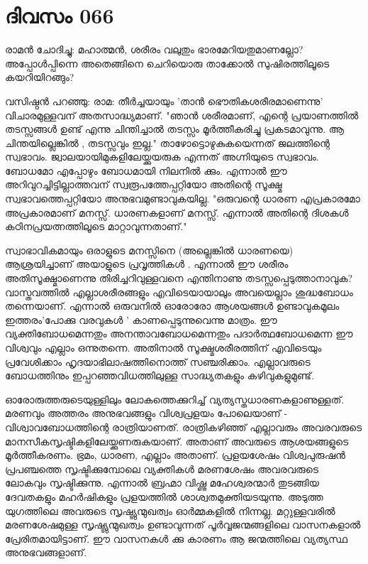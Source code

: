  
\section{ദിവസം 066}


രാമന്‍ ചോദിച്ചു: മഹാത്മന്‍, ശരീരം വലുതും ഭാരമേറിയതുമാണല്ലോ? അപ്പോള്‍പ്പിന്നെ അതെങ്ങിനെ ചെറിയൊരു താക്കോൽ സുഷിരത്തിലൂടെ കയറിയിറങ്ങും?

വസിഷ്ഠന്‍ പറഞ്ഞു: രാമ: തീര്‍ച്ചയായും 'താന്‍ ഭൌതികശരീരമാണെന്നു' വിചാരമുള്ളവന്‌ അതസാദ്ധ്യമാണ്‌. "ഞാന്‍ ശരീരമാണ്‌, എന്റെ പ്രയാണത്തില്‍ തടസ്സങ്ങള്‍ ഉണ്ട്‌ എന്നു ചിന്തിച്ചാല്‍ തടസ്സം മൂര്‍ത്തീകരിച്ചു പ്രകടമാവുന്നു. ആ ചിന്തയില്ലെങ്കില്‍ , തടസ്സവും ഇല്ല." താഴോട്ടൊഴുകുകയെന്നത്‌ ജലത്തിന്റെ സ്വഭാവം. ജ്വാലയായിമുകളിലേയ്ക്കുയരുക എന്നത്‌ അഗ്നിയുടെ സ്വഭാവം. ബോധമോ എപ്പോഴും ബോധമായി നിലനില്‍ ക്കും. എന്നാല്‍ ഈ അറിവുറച്ചിട്ടില്ലാത്തവന്‌ സ്വരൂപത്തേപ്പറ്റിയോ അതിന്റെ സൂക്ഷ്മ സ്വഭാവത്തെപ്പറ്റിയോ അനുഭവമുണ്ടാവുകയില്ല. "ഒരുവന്റെ ധാരണ എപ്രകാരമോ അപ്രകാരമാണ്‌ മനസ്സ്‌. ധാരണകളാണ്‌ മനസ്സ്‌. എന്നാല്‍ അതിന്റെ ദിശകള്‍ കഠിനപ്രയത്നത്തിലൂടെ മാറ്റാവുന്നതാണ്‌."

സ്വാഭാവികമായും ഒരാളുടെ മനസ്സിനെ (അല്ലെങ്കില്‍ ധാരണയെ) ആശ്രയിച്ചാണ്‌ അയാളുടെ പ്രവൃത്തികള്‍ . എന്നാല്‍ ഈ ശരീരം അതിസൂക്ഷ്മാണെന്നു തിരിച്ചറിവുള്ളവനെ എന്തിനാണു തടസ്സപ്പെടുത്താനാവുക? വാസ്തവത്തില്‍ എല്ലാശരീരങ്ങളും എവിടെയായാലും അവയെല്ലാം ശുദ്ധബോധം തന്നെയാണ്‌. എന്നാല്‍ ഒരുവനില്‍ ഓരോരോ ആശയങ്ങള്‍ ഉണ്ടാവുകമൂലം ഇത്തരം'പോക്കു വരവുകള്‍ ' കാണപ്പെടുന്നുവെന്നു മാത്രം. ഈ വ്യക്തിബോധമെന്നതും അനന്താവബോധമെന്നതും പദാര്‍ത്ഥബോധമെന്ന ഈ വിശ്വവും എല്ലാം ഒന്നുതന്നെ. അതിനാല്‍ സൂക്ഷ്മശരീരത്തിന്‌ എവിടെയും പ്രവേശിക്കാം ഹൃദയാഭിലാഷത്തിനൊത്ത്‌ സഞ്ചരിക്കാം. എല്ലാവരുടെ ബോധത്തിനും ഇപ്പറഞ്ഞവിധത്തിലുള്ള സാദ്ധ്യതകളും കഴിവുകളുമുണ്ട്‌. 

ഓരോരുത്തരുടെയുള്ളിലും ലോകത്തെക്കുറിച്ച്‌ വ്യത്യസ്തധാരണകളാണുള്ളത്‌. മരണവും അത്തരം അനുഭവങ്ങളും വിശ്വപ്രളയം പോലെയാണ്‌ - വിശ്വാവബോധത്തിന്റെ രാത്രിയാണത്‌. രാത്രികഴിഞ്ഞ്‌ എല്ലാവരും അവരവരുടെ മാനസീകസൃഷ്ടികളിലേയ്ക്കുണരുകയാണ്‌. അതാണ്‌ അവരുടെ ആശയങ്ങളുടെ മൂര്‍ത്തീകരണം. ഭ്രമം, ധാരണ, എല്ലാം അതാണ്‌. പ്രളയശേഷം വിശ്വപുരുഷന്‍ പ്രപഞ്ചത്തെ സൃഷ്ടിക്കുമ്പോലെ വ്യക്തികള്‍ മരണശേഷം അവരവരുടെ ലോകവും സൃഷ്ടിക്കുന്നു. എന്നാല്‍ ബ്രഹ്മാ വിഷ്ണു മഹേശ്വരന്മാര്‍ തുടങ്ങിയ ദേവതകളും മഹര്‍ഷികളും പ്രളയത്തില്‍ ശാശ്വതമുക്തിയടയുന്നു. അടുത്ത യുഗത്തിലെ അവരുടെ സൃഷ്ട്യുന്മുഖത്വം ഓര്‍മ്മകളില്‍ നിന്നല്ല. മറ്റുള്ളവരില്‍ മരണശേഷമുള്ള സൃഷ്ട്യുന്മുഖത്വം ഉണ്ടാവുന്നത്‌ പൂര്‍വ്വജന്മങ്ങളിലെ വാസനകളാല്‍ പ്രേരിതമായിട്ടാണ്‌. ഈ വാസനകള്‍ ക്കു കാരണം ആ ജന്മത്തിലെ വ്യത്യസ്ഥ അനുഭവങ്ങളാണ്‌.

